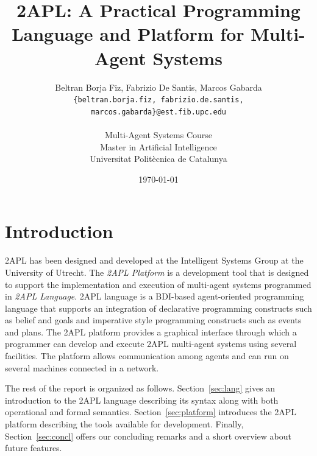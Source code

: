 \documentclass[a4paper]{article}
\begin{document}
\title{2APL: A Practical Programming Language and Platform for Multi-Agent Systems}
 
\author{Beltran Borja Fiz, Fabrizio De Santis, Marcos Gabarda\\
\small \texttt{\{beltran.borja.fiz, fabrizio.de.santis, marcos.gabarda\}@est.fib.upc.edu}\\
\\
Multi-Agent Systems Course\\
Master in Artificial Intelligence\\
Universitat Polit\`ecnica de Catalunya}
\date{\today}

\newenvironment{fminipage}%
  {\begin{Sbox}\begin{minipage}}%
  {\end{minipage}\end{Sbox}\fbox{\TheSbox}}


\maketitle

\tableofcontents

\section{Introduction}

2APL has been designed and developed at the Intelligent Systems Group at the University of Utrecht. The \emph{2APL Platform} is a development tool that is designed to support the implementation and execution of multi-agent systems programmed in \emph{2APL Language}. 2APL language is a BDI-based agent-oriented programming language that supports an integration of declarative programming constructs such as belief and goals and imperative style programming constructs such as events and plans. The 2APL platform
provides a graphical interface through which a programmer can develop and execute 2APL multi-agent systems using several facilities. The platform allows communication among agents and can run on several machines connected in a network.

The rest of the report is organized as follows. Section~\ref{sec:lang} gives an introduction to the 2APL language describing its syntax along with both operational and formal semantics. Section~\ref{sec:platform} introduces the 2APL platform describing the tools available for development. Finally, Section~\ref{sec:concl} offers our concluding remarks and a short overview about future features.
\end{document}
